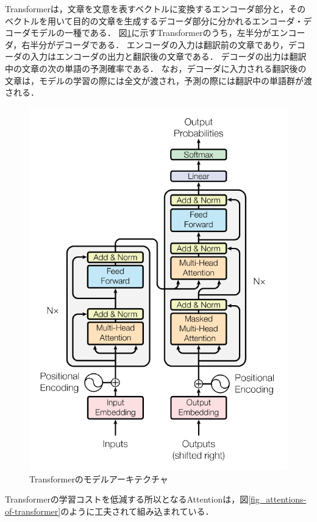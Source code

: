 \documentclass[12pt,a4j,dvipdfmx]{jreport}
\begin{document}
Transformerは，文章を文意を表すベクトルに変換するエンコーダ部分と，そのベクトルを用いて目的の文章を生成するデコーダ部分に分かれるエンコーダ・デコーダモデルの一種である．
図\ref{fig_transformer}に示すTransformerのうち，左半分がエンコーダ，右半分がデコーダである．
エンコーダの入力は翻訳前の文章であり，デコーダの入力はエンコーダの出力と翻訳後の文章である．
デコーダの出力は翻訳中の文章の次の単語の予測確率である．
なお，デコーダに入力される翻訳後の文章は，モデルの学習の際には全文が渡され，予測の際には翻訳中の単語群が渡される．

\begin{figure}[H]
	\centering
	\includegraphics[keepaspectratio, width=120mm]{img/transformer.png}
	\caption{Transformerのモデルアーキテクチャ\protect\footnotemark[2]}
	\label{fig_transformer}
\end{figure}

Transformerの学習コストを低減する所以となるAttentionは，図\ref{fig_attentions-of-transformer}のように工夫されて組み込まれている．
\end{document}
